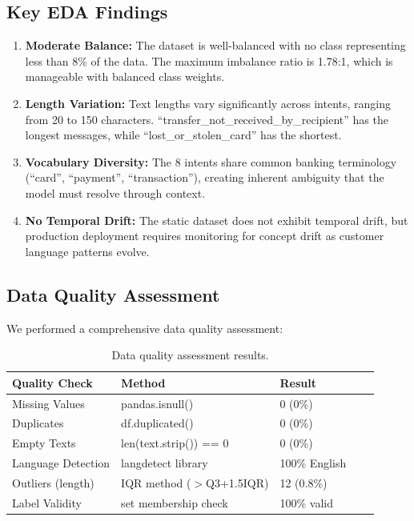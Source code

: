 \documentclass[12pt,a4paper]{article}
\renewcommand{\arraystretch}{1.5}
\newcommand{\goldrowcolors}{%
    \rowcolors{2}{bgCard}{bgDark}%
}
\newcommand{\tableheader}[1]{\textcolor{accentGold}{\textbf{#1}}}
\newcommand{\tablehdrrow}{\rowcolor{accentCard}}
\begin{document}
\subsection{Key EDA Findings}
\label{subsec:eda-findings}

\begin{insightbox}
\begin{enumerate}[leftmargin=*]
    \item \textbf{Moderate Balance:} The dataset is well-balanced with no class representing less than 8\% of the data. The maximum imbalance ratio is 1.78:1, which is manageable with balanced class weights.
    \item \textbf{Length Variation:} Text lengths vary significantly across intents, ranging from 20 to 150 characters. ``transfer\_not\_received\_by\_recipient'' has the longest messages, while ``lost\_or\_stolen\_card'' has the shortest.
    \item \textbf{Vocabulary Diversity:} The 8 intents share common banking terminology (``card'', ``payment'', ``transaction''), creating inherent ambiguity that the model must resolve through context.
    \item \textbf{No Temporal Drift:} The static dataset does not exhibit temporal drift, but production deployment requires monitoring for concept drift as customer language patterns evolve.
\end{enumerate}
\end{insightbox}

\subsection{Data Quality Assessment}
\label{subsec:data-quality}

We performed a comprehensive data quality assessment:

\begin{table}[H]
\centering
\goldrowcolors
\renewcommand{\arraystretch}{1.5}
\begin{tabular}{@{}L{4cm} V L{5cm} V L{4cm}@{}}
\toprule
\tablehdrrow
\tableheader{Quality Check} & \tableheader{Method} & \tableheader{Result} \\
\midrule
Missing Values & pandas.isnull() & 0 (0\%) \\
Duplicates & df.duplicated() & 0 (0\%) \\
Empty Texts & len(text.strip()) == 0 & 0 (0\%) \\
Language Detection & langdetect library & 100\% English \\
Outliers (length) & IQR method ($>$Q3+1.5IQR) & 12 (0.8\%) \\
Label Validity & set membership check & 100\% valid \\
\bottomrule
\end{tabular}
\caption{Data quality assessment results.}
\label{tab:data-quality}
\end{table}
\end{document}
